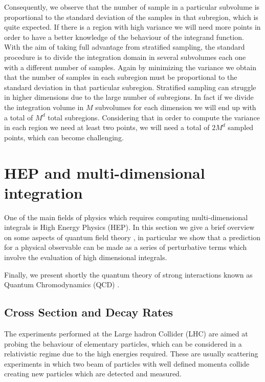 \documentclass[../main/main.tex]{subfiles}
\begin{document}
Consequently, we observe that the number of sample in a particular subvolume is proportional to the standard deviation of the samples in that subregion, which is quite expected. If there is a region with high variance we will need more points in order to have a better knowledge of the behaviour of the 
integrand function.
\newline
With the aim of taking full advantage from stratified sampling, the standard procedure is to divide
the integration domain in several subvolumes each one with a different number of samples. Again by minimizing the variance we obtain that the number of samples in each subregion must be proportional
to the standard deviation in that particular subregion.
\newline
Stratified sampling can struggle in higher dimensions due to the large number of subregions.
In fact if we divide the integration volume in $M$ subvolumes for each dimension we will end up with a total of $M^d$  total subregions. Considering that in order to compute the variance in each region we need at least two points, we will need a total of $2 M^d$ sampled points, which can become challenging.



\section{HEP and multi-dimensional integration}
One of the main fields of physics which requires computing multi-dimensional integrals is High Energy Physics (HEP).
In this section we give a brief overview on some aspects of quantum field theory \cite{Peskin:1995ev, Schwartz:2017hep}, in particular we show that a prediction for a physical
observable can be made as a series of perturbative terms which involve the evaluation of high dimensional integrals.

Finally, we present shortly the quantum theory of strong interactions known as Quantum Chromodynamics (QCD) \cite{Collins:2011zzd, Muta:2010xua, Ellis:1991qj, Skands:2012ts}.


\subsection{Cross Section and Decay Rates}
The experiments performed at the Large hadron Collider (LHC) \cite{Aad:2008zzm, Chatrchyan:2008aa} are aimed at probing the behaviour of elementary particles, which can be considered in a 
relativistic regime due to the high energies required. These are usually scattering experiments in which two beam of particles with well defined momenta collide creating new particles which are detected and measured.
\end{document}
